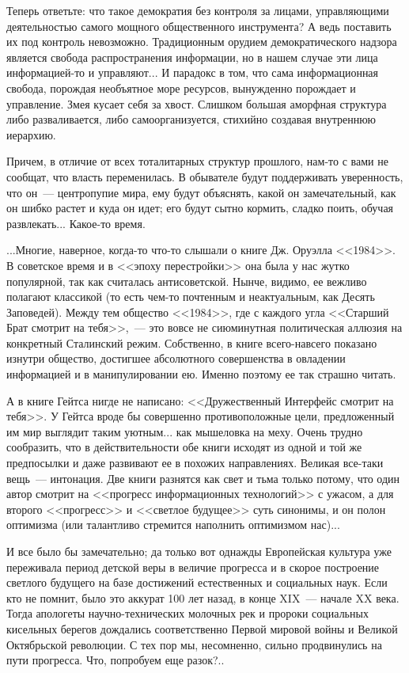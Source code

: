 \documentclass{scrbook}
\newcommand{\flqq}{<<}
\newcommand{\frqq}{>>}
\newcommand{\mdash}{~--- }
\newcommand{\commamdash}{~--- } %
\begin{document}
Теперь ответьте: что такое демократия без контроля за лицами, управляющими деятельностью самого мощного общественного инструмента? А ведь поставить их под контроль невозможно. Традиционным орудием демократического надзора является свобода распространения информации, но в нашем случае эти лица информацией-то и управляют... И парадокс в том, что сама информационная свобода, порождая необъятное море ресурсов, вынужденно порождает и управление. Змея кусает себя за хвост. Слишком большая аморфная структура либо разваливается, либо самоорганизуется, стихийно создавая внутреннюю иерархию.

Причем, в отличие от всех тоталитарных структур прошлого, нам-то с вами не сообщат, что власть переменилась. В обывателе будут поддерживать уверенность, что он{\mdash}центропупие мира, ему будут объяснять, какой он замечательный, как он шибко растет и куда он идет; его будут сытно кормить, сладко поить, обучая развлекать... Какое-то время.

...Многие, наверное, когда-то что-то слышали о книге Дж. Оруэлла {\flqq}1984{\frqq}. В советское время и в {\flqq}эпоху перестройки{\frqq} она была у нас жутко популярной, так как считалась антисоветской. Нынче, видимо, ее вежливо полагают классикой (то есть чем-то почтенным и неактуальным, как Десять Заповедей). Между тем общество {\flqq}1984{\frqq}, где с каждого угла {\flqq}Старший Брат смотрит на тебя{\frqq},{\commamdash}это вовсе не сиюминутная политическая аллюзия на конкретный Сталинский режим. Собственно, в книге всего-навсего показано изнутри общество, достигшее абсолютного совершенства в овладении информацией и в манипулировании ею. Именно поэтому ее так страшно читать.

А в книге Гейтса нигде не написано: {\flqq}Дружественный Интерфейс смотрит на тебя{\frqq}. У Гейтса вроде бы совершенно противоположные цели, предложенный им мир выглядит таким уютным... как мышеловка на меху. Очень трудно сообразить, что в действительности обе книги исходят из одной и той же предпосылки и даже развивают ее в похожих направлениях. Великая все-таки вещь{\mdash}интонация. Две книги разнятся как свет и тьма только потому, что один автор смотрит на {\flqq}прогресс информационных технологий{\frqq} с ужасом, а для второго {\flqq}прогресс{\frqq} и {\flqq}светлое будущее{\frqq} суть синонимы, и он полон оптимизма (или талантливо стремится наполнить оптимизмом нас)...

И все было бы замечательно; да только вот однажды Европейская культура уже переживала период детской веры в величие прогресса и в скорое построение светлого будущего на базе достижений естественных и социальных наук. Если кто не помнит, было это аккурат 100 лет назад, в конце XIX{\mdash}начале XX века. Тогда апологеты научно-технических молочных рек и пророки социальных кисельных берегов дождались соответственно Первой мировой войны и Великой Октябрьской революции. С тех пор мы, несомненно, сильно продвинулись на пути прогресса. Что, попробуем еще разок?..
\end{document}
